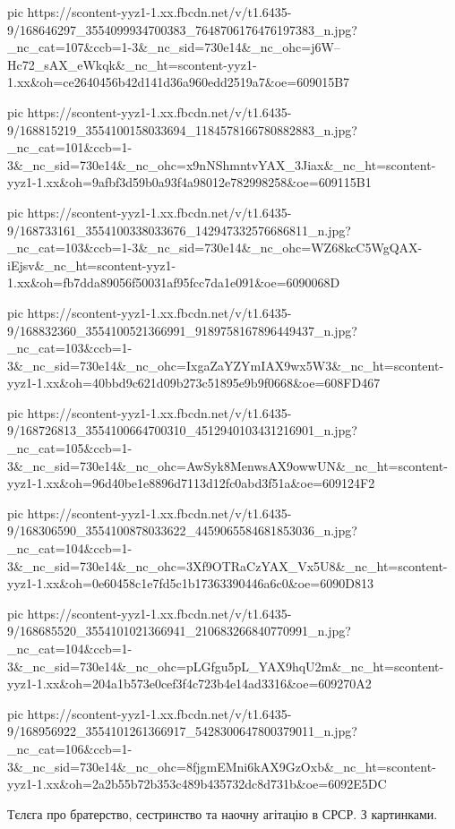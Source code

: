   pic https://scontent-yyz1-1.xx.fbcdn.net/v/t1.6435-9/168646297_3554099934700383_7648706176476197383_n.jpg?_nc_cat=107&ccb=1-3&_nc_sid=730e14&_nc_ohc=j6W--Hc72_sAX_eWkqk&_nc_ht=scontent-yyz1-1.xx&oh=ce2640456b42d141d36a960edd2519a7&oe=609015B7

  pic https://scontent-yyz1-1.xx.fbcdn.net/v/t1.6435-9/168815219_3554100158033694_1184578166780882883_n.jpg?_nc_cat=101&ccb=1-3&_nc_sid=730e14&_nc_ohc=x9nNShmntvYAX_3Jiax&_nc_ht=scontent-yyz1-1.xx&oh=9afbf3d59b0a93f4a98012e782998258&oe=609115B1

  pic https://scontent-yyz1-1.xx.fbcdn.net/v/t1.6435-9/168733161_3554100338033676_142947332576686811_n.jpg?_nc_cat=103&ccb=1-3&_nc_sid=730e14&_nc_ohc=WZ68kcC5WgQAX-iEjsv&_nc_ht=scontent-yyz1-1.xx&oh=fb7dda89056f50031af95fcc7da1e091&oe=6090068D

  pic https://scontent-yyz1-1.xx.fbcdn.net/v/t1.6435-9/168832360_3554100521366991_9189758167896449437_n.jpg?_nc_cat=103&ccb=1-3&_nc_sid=730e14&_nc_ohc=IxgaZaYZYmIAX9wx5W3&_nc_ht=scontent-yyz1-1.xx&oh=40bbd9c621d09b273c51895e9b9f0668&oe=608FD467

  pic https://scontent-yyz1-1.xx.fbcdn.net/v/t1.6435-9/168726813_3554100664700310_4512940103431216901_n.jpg?_nc_cat=105&ccb=1-3&_nc_sid=730e14&_nc_ohc=AwSyk8MenwsAX9owwUN&_nc_ht=scontent-yyz1-1.xx&oh=96d40be1e8896d7113d12fc0abd3f51a&oe=609124F2

  pic https://scontent-yyz1-1.xx.fbcdn.net/v/t1.6435-9/168306590_3554100878033622_4459065584681853036_n.jpg?_nc_cat=104&ccb=1-3&_nc_sid=730e14&_nc_ohc=3Xf9OTRaCzYAX_Vx5U8&_nc_ht=scontent-yyz1-1.xx&oh=0e60458c1e7fd5c1b17363390446a6c0&oe=6090D813

  pic https://scontent-yyz1-1.xx.fbcdn.net/v/t1.6435-9/168685520_3554101021366941_210683266840770991_n.jpg?_nc_cat=104&ccb=1-3&_nc_sid=730e14&_nc_ohc=pLGfgu5pL_YAX9hqU2m&_nc_ht=scontent-yyz1-1.xx&oh=204a1b573e0cef3f4c723b4e14ad3316&oe=609270A2

  pic https://scontent-yyz1-1.xx.fbcdn.net/v/t1.6435-9/168956922_3554101261366917_5428300647800379011_n.jpg?_nc_cat=106&ccb=1-3&_nc_sid=730e14&_nc_ohc=8fjgmEMni6kAX9GzOxb&_nc_ht=scontent-yyz1-1.xx&oh=2a2b55b72b353c489b435732dc8d731b&oe=6092E5DC
\fi


Тєлєга про братерство, сестринство та наочну агітацію в СРСР. З картинками.  

